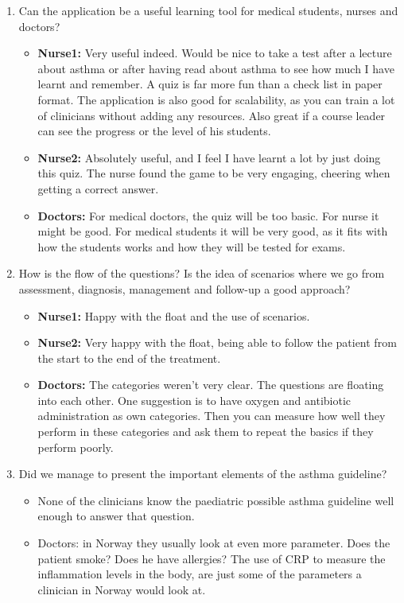 \begin{enumerate}
	\item Can the application be a useful learning tool for medical students, nurses and doctors?
	\begin{itemize}
		\item \textbf{Nurse1:} Very useful indeed. Would be nice to take a test after a lecture about asthma or after having read about asthma to see how much I have learnt and remember. A quiz is far more fun than a check list in paper format. The application is also good for scalability, as you can train a lot of clinicians without adding any resources. Also great if a course leader can see the progress or the level of his students.
		\item \textbf{Nurse2:} Absolutely useful, and I feel I have learnt a lot by just doing this quiz. The nurse found the game to be very engaging, cheering when getting a correct answer. 
		\item \textbf{Doctors:} For medical doctors, the quiz will be too basic. For nurse it might be good. For medical students it will be very good, as it fits with how the students works and how they will be tested for exams.
	\end{itemize}
	\item How is the flow of the questions? Is the idea of scenarios where we go from assessment, diagnosis, management and follow-up a good approach?
	\begin{itemize}
		\item \textbf{Nurse1:} Happy with the float and the use of scenarios.
		\item \textbf{Nurse2:} Very happy with the float, being able to follow the patient from the start to the end of the treatment.
		\item \textbf{Doctors:} The categories weren't very clear. The questions are floating into each other. One suggestion is to have oxygen and antibiotic administration as own categories. Then you can measure how well they perform in these categories and ask them to repeat the basics if they perform poorly.
	\end{itemize}
	\item Did we manage to present the important elements of the asthma guideline?
	\begin{itemize}
		\item None of the clinicians know the paediatric possible asthma guideline \parencite{RepublicofKeny2016} well enough to answer that question.
		\item {Doctors:} in Norway they usually look at even more parameter. Does the patient smoke? Does he have allergies? The use of CRP to measure the inflammation levels in the body, are just some of the parameters a clinician in Norway would look at.

\end{itemize}
\end{enumerate}
